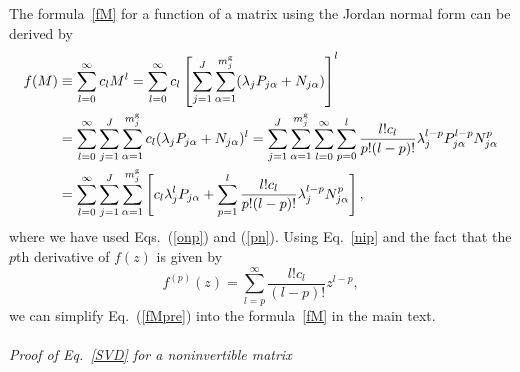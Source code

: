 \documentclass{tADP2e}
\theoremstyle{plain}
\theoremstyle{plain}
\theoremstyle{definition}
\begin{document}
\begin{appendices}
\vspace{3pt}
\noindent
The formula~\eqref{fM} for a function of a matrix using the Jordan normal form can be derived by
\begin{equation}
\begin{split}
f(M)&\equiv\sum^\infty_{l=0}c_l M^l=\sum^\infty_{l=0}c_l\left[\sum^J_{j=1}\sum^{m^{\rm g}_j}_{\alpha=1} (\lambda_jP_{j\alpha}+N_{j\alpha})\right]^l \\
&=\sum^\infty_{l=0}\sum^J_{j=1}\sum^{m^{\rm g}_j}_{\alpha=1}c_l (\lambda_j P_{j\alpha}+N_{j\alpha})^l=\sum^J_{j=1}\sum^{m^{\rm g}_j}_{\alpha=1}\sum^\infty_{l=0}\sum^l_{p=0}\frac{l!c_l}{p!(l-p)!} \lambda^{l-p}_j P_{j\alpha}^{l-p}N_{j\alpha}^p \\
&=\sum^\infty_{l=0}\sum^J_{j=1}\sum^{m^{\rm g}_j}_{\alpha=1}\left[c_l\lambda_j^l P_{j\alpha}+\sum^l_{p=1}\frac{l!c_l}{p!(l-p)!} \lambda_j^{l-p}N_{j\alpha}^p\right],
\end{split}
\label{fMpre}
\end{equation}
where we have used Eqs.~(\ref{onp}) and (\ref{pn}). Using Eq.~\eqref{nip} and the fact that the $p$th derivative of $f(z)$ is given by
\begin{equation}
f^{(p)}(z)=\sum^\infty_{l=p} \frac{l!c_l}{(l-p)!}z^{l-p},
\end{equation}
we can simplify Eq.~(\ref{fMpre}) into the formula~\eqref{fM} in the main text. 
\\
\\
{\it Proof of Eq.~\eqref{SVD} for a noninvertible matrix}


\end{appendices}
\end{document}
